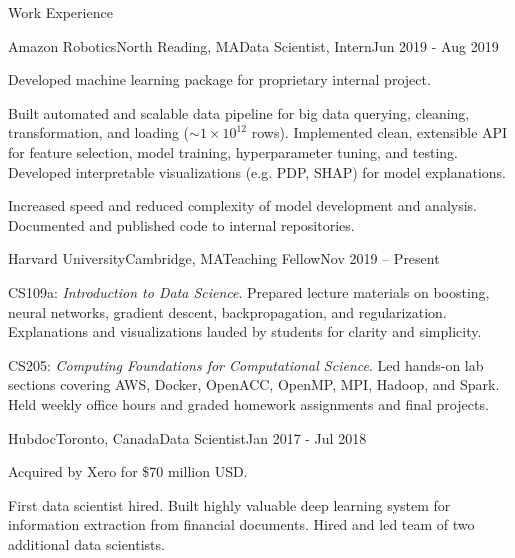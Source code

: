 \documentclass{resume} %
\begin{document}
\begin{rSection}{Work Experience}

\begin{rSubsection}{Amazon Robotics}{North Reading, MA}{Data Scientist, Intern}{Jun 2019 - Aug 2019}

\item
    Developed machine learning package for proprietary internal project.

\item
    Built automated and scalable data pipeline for big data querying, cleaning, transformation, and loading (${\sim} 1 \times 10^{12}$ rows).
    Implemented clean, extensible API for feature selection, model training, hyperparameter tuning, and testing.
    Developed interpretable visualizations (e.g. PDP, SHAP) for model explanations.

\item
    Increased speed and reduced complexity of model development and analysis.
    Documented and published code to internal repositories.

\end{rSubsection}


\begin{rSubsection}{Harvard University}{Cambridge, MA}{Teaching Fellow}{Nov 2019 -- Present}

\item
    CS109a: \emph{Introduction to Data Science}. Prepared lecture materials on boosting, neural networks, gradient descent, backpropagation, and regularization.
    Explanations and visualizations lauded by students for clarity and simplicity.

\item
    CS205: \emph{Computing Foundations for Computational Science}.
    Led hands-on lab sections covering AWS, Docker, OpenACC, OpenMP, MPI, Hadoop, and Spark.
    Held weekly office hours and graded homework assignments and final projects.

\end{rSubsection}


\begin{rSubsection}{Hubdoc}{Toronto, Canada}{Data Scientist}{Jan 2017 - Jul 2018}
\item
    Acquired by Xero for \$70 million USD.
\item
    First data scientist hired.
    Built highly valuable deep learning system for information extraction from financial documents.
    Hired and led team of two additional data scientists.


\end{rSubsection}
\end{rSection}
\end{document}

